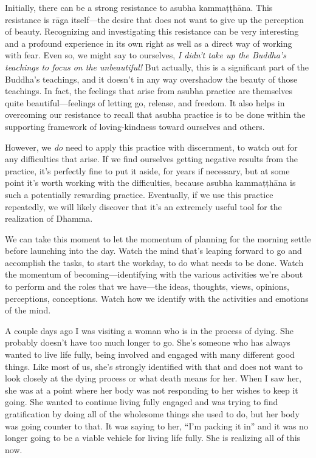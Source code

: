 Initially, there can be a strong resistance to asubha kammaṭṭhāna. 
This resistance is rāga itself---the desire that does not want to give 
up the perception of beauty. Recognizing and investigating this 
resistance can be very interesting and a profound experience in its own 
right as well as a direct way of working with fear. Even so, we might 
say to ourselves, \emph{I didn't take up the Buddha's teachings to 
focus on the unbeautiful!} But actually, this is a significant part of 
the Buddha's teachings, and it doesn't in any way overshadow the beauty 
of those teachings. In fact, the feelings that arise from asubha 
practice are themselves quite beautiful---feelings of letting go, 
release, and freedom. It also helps in overcoming our resistance to 
recall that asubha practice is to be done within the supporting 
framework of loving-kindness toward ourselves and others.

However, we \emph{do} need to apply this practice with discernment, to 
watch out for any difficulties that arise. If we find ourselves getting 
negative results from the practice, it's perfectly fine to put it 
aside, for years if necessary, but at some point it's worth working 
with the difficulties, because asubha kammaṭṭhāna is such a 
potentially rewarding practice. Eventually, if we use this practice 
repeatedly, we will likely discover that it's an extremely useful tool 
for the realization of Dhamma.


We can take this moment to let the momentum of planning for the morning 
settle before launching into the day. Watch the mind that's leaping 
forward to go and accomplish the tasks, to start the workday, to do 
what needs to be done. Watch the momentum of becoming---identifying 
with the various activities we're about to perform and the roles that 
we have---the ideas, thoughts, views, opinions, perceptions, 
conceptions. Watch how we identify with the activities and emotions of 
the mind.

A couple days ago I was visiting a woman who is in the process of 
dying. She probably doesn't have too much longer to go. She's someone 
who has always wanted to live life fully, being involved and engaged 
with many different good things. Like most of us, she's strongly 
identified with that and does not want to look closely at the dying 
process or what death means for her. When I saw her, she was at a point 
where her body was not responding to her wishes to keep it going. She 
wanted to continue living fully engaged and was trying to find 
gratification by doing all of the wholesome things she used to do, but 
her body was going counter to that. It was saying to her, ``I'm packing 
it in'' and it was no longer going to be a viable vehicle for living 
life fully. She is realizing all of this now.

